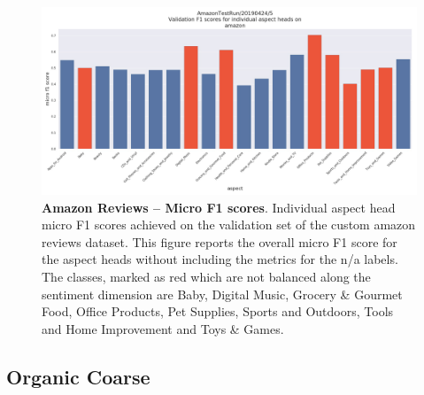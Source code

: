 \begin{figure}[H]
	\centering
	\includegraphics[width=\textwidth]{figures/08_appendix/08_am_headResults}
	\caption{\textbf{Amazon Reviews -- Micro F1 scores}. Individual aspect head micro F1 scores achieved on the validation set of the custom amazon reviews dataset. This figure reports the overall micro F1 score for the aspect heads without including the metrics for the n/a labels. The classes, marked as red which are not balanced along the sentiment dimension are Baby, Digital Music, Grocery \& Gourmet Food, Office Products, Pet Supplies, Sports and Outdoors, Tools and Home Improvement and Toys \& Games.}
	\label{fig:08_am_val_f1}
\end{figure}

\subsection{Organic Coarse}

